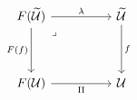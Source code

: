 \[\begin{tikzcd}
	{F(\Tm)} && \Tm \\
	\\
	{F(\Ty)} && \Ty
	\arrow["\lambda", from=1-1, to=1-3]
	\arrow["\Pi"', from=3-1, to=3-3]
	\arrow["{F(f)}"', from=1-1, to=3-1]
	\arrow["f", from=1-3, to=3-3]
	\arrow["\lrcorner"{anchor=center, pos=0.125}, draw=none, from=1-1, to=3-3]
\end{tikzcd}\]